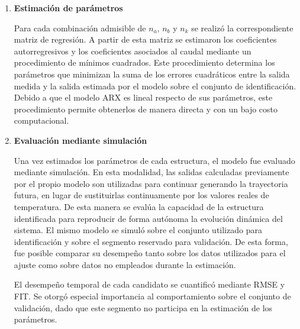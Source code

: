 \documentclass[11pt]{report}
\begin{document}
\begin{enumerate}
    En lugar de seleccionar estos órdenes de manera arbitraria, se definió una malla de combinaciones posibles de $n_{a}$, $n_{b}$ y $n_{k}$. Para esta primera exploración se utilizaron rangos acotados, suficientes para evaluar estructuras de distinta complejidad sin generar un número excesivo de modelos candidatos. En cada combinación de órdenes de $n_{a}$, $n_{b}$ y $n_{k}$ se construyó la matriz de regresores, la cual reúne los valores pasados de la salida y de la entrada utilizados para estimar la salida actual del modelo. Debido a que su construcción depende directamente de los órdenes seleccionados, se verificó que cada combinación dispusiera de un número suficiente de muestras para realizar una estimación confiable. Las configuraciones que no cumplían esta condición fueron descartadas antes del proceso de identificación.
    \item \textbf{Estimación de parámetros}

    Para cada combinación admisible de $n_{a}$, $n_{b}$ y $n_{k}$ se realizó la correspondiente matriz de regresión. A partir de esta matriz se estimaron los coeficientes autorregresivos y los coeficientes asociados al caudal mediante un procedimiento de mínimos cuadrados. Este procedimiento determina los parámetros que minimizan la suma de los errores cuadráticos entre la salida medida y la salida estimada por el modelo sobre el conjunto de identificación. Debido a que el modelo ARX es lineal respecto de sus parámetros, este procedimiento permite obtenerlos de manera directa y con un bajo costo computacional.
    
    \item \textbf{Evaluación mediante simulación}
    
    Una vez estimados los parámetros de cada estructura, el modelo fue evaluado mediante simulación. En esta modalidad, las salidas calculadas previamente por el propio modelo son utilizadas para continuar generando la trayectoria futura, en lugar de sustituirlas continuamente por los valores reales de temperatura. De esta manera se evalúa la capacidad de la estructura identificada para reproducir de forma autónoma la evolución dinámica del sistema. El mismo modelo se simuló sobre el conjunto utilizado para identificación y sobre el segmento reservado para validación. De esta forma, fue posible comparar su desempeño tanto sobre los datos utilizados para el ajuste como sobre datos no empleados durante la estimación.

    El desempeño temporal de cada candidato se cuantificó mediante RMSE y FIT. Se otorgó especial importancia al comportamiento sobre el conjunto de validación, dado que este segmento no participa en la estimación de los parámetros.


\end{enumerate}
\end{document}
